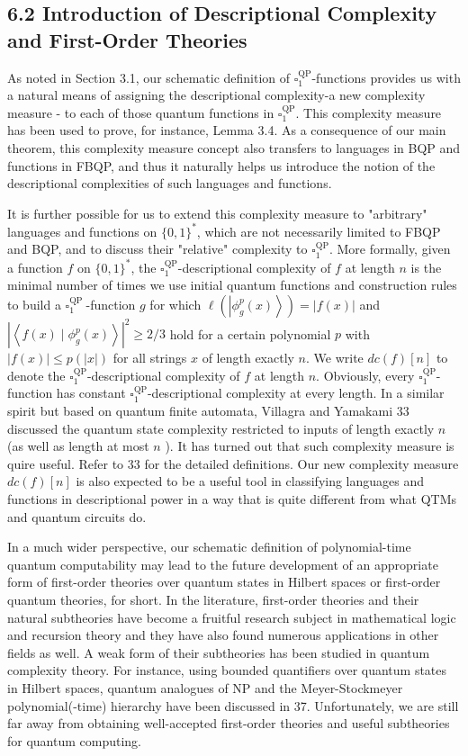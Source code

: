 \documentclass[10pt]{article}
\begin{document}
\subsection*{6.2 Introduction of Descriptional Complexity and First-Order Theories}
As noted in Section 3.1, our schematic definition of $\square_{1}^{\mathrm{QP}}$-functions provides us with a natural means of assigning the descriptional complexity-a new complexity measure - to each of those quantum functions in $\square_{1}^{\mathrm{QP}}$. This complexity measure has been used to prove, for instance, Lemma 3.4. As a consequence of our main theorem, this complexity measure concept also transfers to languages in BQP and functions in FBQP, and thus it naturally helps us introduce the notion of the descriptional complexities of such languages and functions.

It is further possible for us to extend this complexity measure to "arbitrary" languages and functions on $\{0,1\}^{*}$, which are not necessarily limited to FBQP and BQP, and to discuss their "relative" complexity to $\square_{1}^{\mathrm{QP}}$. More formally, given a function $f$ on $\{0,1\}^{*}$, the $\square_{1}^{\mathrm{QP}}$-descriptional complexity of $f$ at length $n$ is the minimal number of times we use initial quantum functions and construction rules to build a $\square_{1}^{\text {QP }}$-function $g$ for which $\ell\left(\left|\phi_{g}^{p}(x)\right\rangle\right)=|f(x)|$ and $\left|\left\langle f(x) \mid \phi_{g}^{p}(x)\right\rangle\right|^{2} \geq 2 / 3$ hold for a certain polynomial $p$ with $|f(x)| \leq p(|x|)$ for all strings $x$ of length exactly $n$. We write $d c(f)[n]$ to denote the $\square_{1}^{\mathrm{QP}}$-descriptional complexity of $f$ at length $n$. Obviously, every $\square_{1}^{\mathrm{QP}}$-function has constant $\square_{1}^{\mathrm{QP}}$-descriptional complexity at every length. In a similar spirit but based on quantum finite automata, Villagra and Yamakami 33 discussed the quantum state complexity restricted to inputs of length exactly $n$ (as well as length at most $n$ ). It has turned out that such complexity measure is quire useful. Refer to 33 for the detailed definitions. Our new complexity measure $d c(f)[n]$ is also expected to be a useful tool in classifying languages and functions in descriptional power in a way that is quite different from what QTMs and quantum circuits do.

In a much wider perspective, our schematic definition of polynomial-time quantum computability may lead to the future development of an appropriate form of first-order theories over quantum states in Hilbert spaces or first-order quantum theories, for short. In the literature, first-order theories and their natural subtheories have become a fruitful research subject in mathematical logic and recursion theory and they have also found numerous applications in other fields as well. A weak form of their subtheories has been studied in quantum complexity theory. For instance, using bounded quantifiers over quantum states in Hilbert spaces, quantum analogues of NP and the Meyer-Stockmeyer polynomial(-time) hierarchy have been discussed in 37. Unfortunately, we are still far away from obtaining well-accepted first-order theories and useful subtheories for quantum computing.
\end{document}

